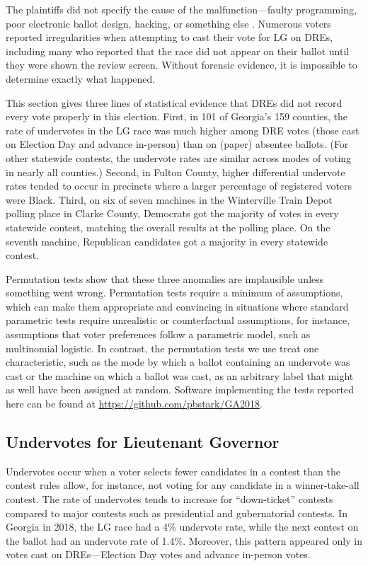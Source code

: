 \documentclass[runningheads]{llncs}
\begin{document}
The plaintiffs did not specify the cause of the malfunction---faulty programming, poor electronic ballot design, hacking, or something else \cite{coalition_crittenden_2019}.
Numerous voters reported irregularities when attempting to cast their vote for LG on DREs,
including many who reported that the race did not appear on their ballot until they were shown the review screen.
Without forensic evidence, it is impossible to determine exactly what happened.

This section gives three lines of statistical evidence that DREs did not record every vote properly in this election.
First, in 101 of Georgia's 159 counties,
the rate of undervotes in the LG race was much higher among DRE votes (those cast on Election Day and advance in-person) than on (paper) absentee ballots.
(For other statewide contests, the undervote rates are similar across modes of voting in nearly all counties.)
Second, in Fulton County, higher differential undervote rates tended to occur in precincts where a larger percentage of registered voters were Black. 
Third, on six of seven machines in the Winterville Train Depot polling place in Clarke County, Democrats got the majority of votes in every statewide contest, matching the overall results at the polling place.
On the seventh machine, Republican candidates got a majority in every statewide contest.

Permutation tests show that these three anomalies are 
implausible unless something went wrong.
Permutation tests require a minimum of assumptions, which can make them appropriate and convincing
in situations where standard parametric tests require unrealistic or counterfactual assumptions,
for instance, assumptions that voter preferences follow a parametric model, such as multinomial logistic.
In contrast, the permutation tests we use treat one characteristic, such as the mode by which a ballot containing an undervote was cast or the machine on which a ballot was cast, as an arbitrary label that might as well have been
assigned at random. 
Software implementing the tests reported here can be found at \url{https://github.com/pbstark/GA2018}.

\subsection{Undervotes for Lieutenant Governor}
Undervotes occur when a voter selects fewer candidates in a contest than the contest rules
allow, for instance, not voting for any candidate in a winner-take-all contest.
The rate of undervotes tends to increase for ``down-ticket'' contests compared to major contests
such as presidential and gubernatorial contests.
In Georgia in 2018, the LG race had a 4\% undervote rate, while the next contest on the ballot had an undervote rate of 1.4\%.
Moreover, this pattern appeared only in votes cast on DREs---Election Day votes and advance in-person votes.
\end{document}
